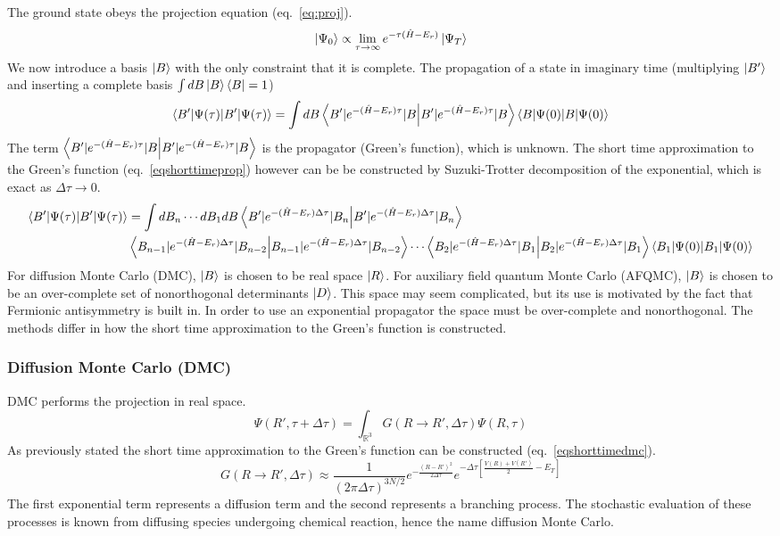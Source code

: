 The ground state obeys the projection equation (eq.~\ref{eq:proj}).
\begin{equation}
\ket{\Psi_0} \propto \lim_{\tau\rightarrow\infty} e^{-\tau (\hat{H} - E_r)} \ket{\Psi_T}
    \label{eq:proj}
\end{equation}
We now introduce a basis $\ket{B}$ with the only constraint that it is complete.
The propagation of a state in imaginary time (multiplying $\ket{B'}$ and inserting a complete basis $\int dB \ket{B}\bra{B} = 1$)
\begin{equation}
\braket{B'|\Psi(\tau)} = \int dB \braket{B'|e^{-(\hat{H}-E_r)\tau}|B}\braket{B|\Psi(0)}
    \label{eqprop}
\end{equation}
The term $\braket{B'|e^{-(\hat{H}-E_r)\tau}|B}$ is the propagator (Green's function), which is unknown. 
The short time approximation to the Green's function (eq.~\ref{eqshorttimeprop}) however can be be constructed by Suzuki-Trotter decomposition of the exponential, which is exact as $\Delta \tau \rightarrow 0$.\cite{Trotter,Suzuki}
\begin{align}
\braket{B'|\Psi(\tau)} &= \int dB_{n} \cdots dB_{1} dB \braket{B'|e^{-(\hat{H}-E_r)\Delta\tau}|B_{n}}\\
                       &\braket{B_{n-1}|e^{-(\hat{H}-E_r)\Delta\tau}|B_{n-2}}\cdots \braket{B_{2}|e^{-(\hat{H}-E_r)\Delta\tau}|B_{1}} \braket{B_{1}|\Psi(0)}
    \label{eqshorttimeprop}
\end{align}
For diffusion Monte Carlo (DMC), $\ket{B}$ is chosen to be real space $\ket{R}$.
For auxiliary field quantum Monte Carlo (AFQMC), $\ket{B}$ is chosen to be an over-complete set of nonorthogonal determinants $\ket{D}$.
This space may seem complicated, but its use is motivated by the fact that Fermionic antisymmetry is built in.
In order to use an exponential propagator the space must be over-complete and nonorthogonal.\cite{Zhang1995,Zhang2003}
The methods differ in how the short time approximation to the Green's function is constructed.

\subsubsection{Diffusion Monte Carlo (DMC)}
DMC performs the projection in real space.\cite{Toulouse2016,Foulkes2001}
\begin{equation}
    \Psi(R',\tau + \Delta\tau) = \int_{\mathbb{R}^3} G(R \rightarrow R',\Delta \tau) \Psi(R,\tau)
\end{equation}
As previously stated the short time approximation to the Green's function can be constructed (eq.~\ref{eqshorttimedmc}).
\begin{equation}
    G(R \rightarrow R', \Delta \tau) \approx \frac{1}{(2\pi\Delta\tau)^{3N/2}} e^{-\frac{(R - R')^2 }{2\Delta\tau}} e^{-\Delta\tau[\frac{V(R) + V(R')}{2} - E_T]}
\label{eqshorttimedmc}
\end{equation}
The first exponential term represents a diffusion term and the second represents a branching process.
The stochastic evaluation of these processes is known from diffusing species undergoing chemical reaction, hence the name diffusion Monte Carlo.

